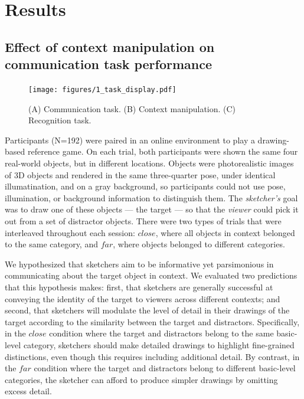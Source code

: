 \documentclass[9pt,twocolumn,twoside]{pnas-new}
\begin{document}
\section*{Results}

\subsection*{Effect of context manipulation on communication task performance}



\begin{figure}[htbp]
\centering
\texttt{[image: figures/1\_task\_display.pdf]}
\caption{(A) Communication task. (B) Context manipulation. (C) Recognition task.}
\label{task_display}
\end{figure}

Participants (N=192) were paired in an online environment to play a drawing-based reference game. On each trial, both participants were shown the same four real-world objects, but in different locations. Objects were photorealistic images of 3D objects and rendered in the same three-quarter pose, under identical illumatination, and on a gray background, so participants could not use pose, illumination, or background information to distinguish them. The \textit{sketcher's} goal was to draw one of these objects --- the target --- so that the \textit{viewer} could pick it out from a set of distractor objects. There were two types of trials that were interleaved throughout each session: \textit{$close$}, where all objects in context belonged to the same category, and \textit{$far$}, where objects belonged to different categories.

We hypothesized that sketchers aim to be informative yet parsimonious in communicating about the target object in context. We evaluated two predictions that this hypothesis makes: first, that sketchers are generally successful at conveying the identity of the target to viewers across different contexts; and second, that sketchers will modulate the level of detail in their drawings of the target according to the similarity between the target and distractors. Specifically, in the \textit{$close$} condition where the target and distractors belong to the same basic-level category, sketchers should make detailed drawings to highlight fine-grained distinctions, even though this requires including additional detail. By contrast, in the \textit{$far$} condition where the target and distractors belong to different basic-level categories, the sketcher can afford to produce simpler drawings by omitting excess detail.
\end{document}
